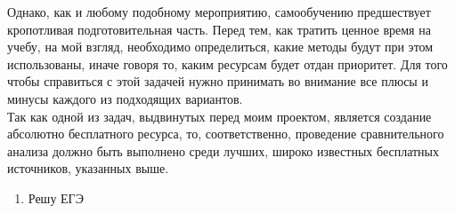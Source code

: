 \documentclass[a4paper, 12pt]{extarticle}
\begin{document}
Однако, как и любому подобному мероприятию, самообучению предшествует
кропотливая подготовительная часть. Перед тем, как тратить ценное время на
учебу, на мой взгляд, необходимо определиться, какие методы будут при этом
использованы, иначе говоря то, каким ресурсам будет отдан приоритет. Для того
чтобы справиться с этой задачей нужно принимать во внимание все плюсы и минусы
каждого из подходящих вариантов.
\\

Так как одной из задач, выдвинутых перед моим проектом, является создание
абсолютно бесплатного ресурса, то, соответственно, проведение сравнительного анализа должно быть
выполнено среди лучших, широко известных бесплатных источников, указанных выше.
\\

\begin{enumerate}
    \item{\large Решу ЕГЭ}


\end{enumerate}
\end{document}
